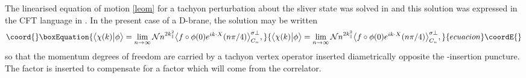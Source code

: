 \documentclass[letterpaper,12pt]{article}
\def\Pcm#1{{\mathcal{#1}}}
\begin{document}
The linearised equation of motion \eqref{leom} for a tachyon perturbation \coordHE{}
about the sliver state \myHighlight{$\Xi$}\coordHE{} was solved in \cite{HK} and this
solution was expressed in the CFT language in \cite{RSZ6}. In the present case of
a D\coordHE{}-brane, the solution may be written
\begin{equation}\coord{}\boxEquation{
\label{chi}
\big\langle \chi(k) \big| \phi \big\rangle = \lim_{n \rightarrow \infty} 
                       \Pcm{N}n^{2k_\parallel^2}\big\langle f \circ \phi(0) e^{ik\cdot X}(n\pi/4)\big\rangle^{\sigma \perp}_{C_n}
,}{
\big\langle \chi(k) \big| \phi \big\rangle = \lim_{n \rightarrow \infty} 
                       \Pcm{N}n^{2k_\parallel^2}\big\langle f \circ \phi(0) e^{ik\cdot X}(n\pi/4)\big\rangle^{\sigma \perp}_{C_n}
,}{ecuacion}\coordE{}\end{equation}
so that the momentum degrees of freedom are carried by a tachyon vertex operator inserted 
diametrically opposite the \myHighlight{$\phi$}\coordHE{}-insertion puncture. The factor \coordHE{} is inserted to 
compensate for a factor \coordHE{} which will come from the correlator.
\end{document}
